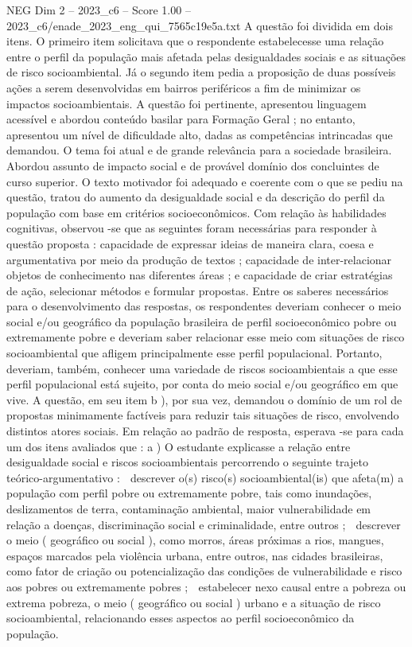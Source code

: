 \begin{textsample}{NEG Dim 2 – 2023\_c6 – Score 1.00 – 2023\_c6/enade\_2023\_eng\_qui\_7565c19e5a.txt}
A questão foi dividida em dois itens.
O primeiro item solicitava que o respondente estabelecesse uma relação entre o perfil da população mais afetada pelas desigualdades sociais e as situações de risco socioambiental.
Já o segundo item pedia a proposição de duas possíveis ações a serem desenvolvidas em bairros periféricos a fim de minimizar os impactos socioambientais.
A questão foi pertinente, apresentou linguagem acessível e abordou conteúdo basilar para Formação Geral ; no entanto, apresentou um nível de dificuldade alto, dadas as competências intrincadas que demandou.
O tema foi atual e de grande relevância para a sociedade brasileira.
Abordou assunto de impacto social e de provável domínio dos concluintes de curso superior.
O texto motivador foi adequado e coerente com o que se pediu na questão, tratou do aumento da desigualdade social e da descrição do perfil da população com base em critérios socioeconômicos.
Com relação às habilidades cognitivas, observou -se que as seguintes foram necessárias para responder à questão proposta : capacidade de expressar ideias de maneira clara, coesa e argumentativa por meio da produção de textos ; capacidade de inter-relacionar objetos de conhecimento nas diferentes áreas ; e capacidade de criar estratégias de ação, selecionar métodos e formular propostas.
Entre os saberes necessários para o desenvolvimento das respostas, os respondentes deveriam conhecer o meio social e/ou geográfico da população brasileira de perfil socioeconômico pobre ou extremamente pobre e deveriam saber relacionar esse meio com situações de risco socioambiental que afligem principalmente esse perfil populacional.
Portanto, deveriam, também, conhecer uma variedade de riscos socioambientais a que esse perfil populacional está sujeito, por conta do meio social e/ou geográfico em que vive.
A questão, em seu item b ), por sua vez, demandou o domínio de um rol de propostas minimamente factíveis para reduzir tais situações de risco, envolvendo distintos atores sociais.
Em relação ao padrão de resposta, esperava -se para cada um dos itens avaliados que : a ) O estudante explicasse a relação entre desigualdade social e riscos socioambientais percorrendo o seguinte trajeto teórico-argumentativo :  descrever o(s) risco(s) socioambiental(is) que afeta(m) a população com perfil pobre ou extremamente pobre, tais como inundações, deslizamentos de terra, contaminação ambiental, maior vulnerabilidade em relação a doenças, discriminação social e criminalidade, entre outros ;  descrever o meio ( geográfico ou social ), como morros, áreas próximas a rios, mangues, espaços marcados pela violência urbana, entre outros, nas cidades brasileiras, como fator de criação ou potencialização das condições de vulnerabilidade e risco aos pobres ou extremamente pobres ;  estabelecer nexo causal entre a pobreza ou extrema pobreza, o meio ( geográfico ou social ) urbano e a situação de risco socioambiental, relacionando esses aspectos ao perfil socioeconômico da população.

\end{textsample}
